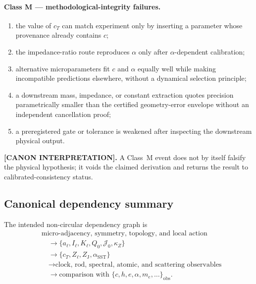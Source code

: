 \documentclass[11pt]{article}
\theoremstyle{definition}
\theoremstyle{plain}
\theoremstyle{remark}
\begin{document}
\paragraph{Class M --- methodological-integrity failures.}
\begin{enumerate}
    \item the value of $c_T$ can match experiment only by inserting a parameter
    whose provenance already contains $c$;
    \item the impedance-ratio route reproduces $\alpha$ only after
    $\alpha$-dependent calibration;
    \item alternative microparameters fit $c$ and $\alpha$ equally well while
    making incompatible predictions elsewhere, without a dynamical selection
    principle;
    \item a downstream mass, impedance, or constant extraction quotes precision
    parametrically smaller than the certified geometry-error envelope without an
    independent cancellation proof;
    \item a preregistered gate or tolerance is weakened after inspecting the
    downstream physical output.
\end{enumerate}

\textbf{[CANON INTERPRETATION].}
A Class~M event does not by itself falsify the physical hypothesis; it voids the
claimed derivation and returns the result to calibrated-consistency status.

\subsection{Canonical dependency summary}
\label{subsec:canonical_dependency_summary}

The intended non-circular dependency graph is
\begin{align}
    &\text{micro-adjacency, symmetry, topology, and local action}
    \nonumber\\
    &\quad\longrightarrow
    \{a_\ell,I_\ell,K_\ell,Q_0,\mathcal J_0,\kappa_Z\}
    \nonumber\\
    &\quad\longrightarrow
    \{c_T,Z_\ell,Z_{\mathrm J},\alpha_{\mathrm{SST}}\}
    \nonumber\\
    &\quad\longrightarrow
    \text{clock, rod, spectral, atomic, and scattering observables}
    \nonumber\\
    &\quad\longrightarrow
    \text{comparison with }\{c,h,e,\alpha,m_e,\ldots\}_{\mathrm{obs}}.
    \label{eq:canonical_zero_legacy_dependency_graph}
\end{align}
\end{document}
